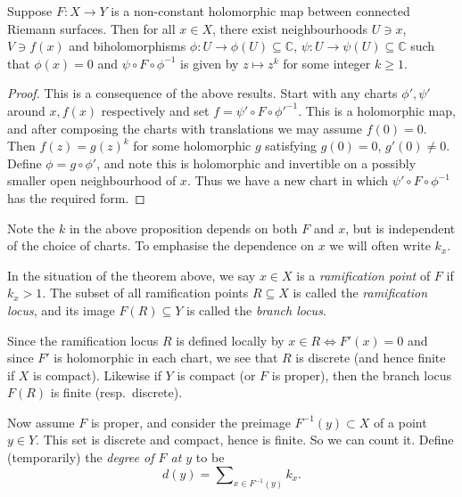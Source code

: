 \begin{proposition}
    Suppose \(F:X\to Y\) is a non-constant holomorphic map between connected
    Riemann surfaces. Then for all \(x\in X\), there exist neighbourhoods \(U\ni
    x\), \(V\ni f(x)\) and biholomorphisms \(\phi:U\to \phi(U)\subseteq
    \mathbb{C}\), \(\psi:U\to \psi(U)\subseteq \mathbb{C}\) such that
    \(\phi(x)=0\) and \(\psi\circ F\circ \phi^{-1}\) is
    given by \(z\mapsto z^k\) for some integer \(k\geq 1\).

    \begin{proof}
        This is a consequence of the above results. Start with any charts
        \(\phi', \psi'\) around \(x, f(x)\) respectively and set \(f=\psi'\circ
        F\circ \phi'^{-1}\). This is a holomorphic map, and after composing the
        charts with translations we may assume \(f(0)=0\). Then \(f(z)=g(z)^k\)
        for some holomorphic \(g\) satisfying \(g(0)=0\), \(g'(0)\neq 0\).
        Define \(\phi=g\circ \phi'\), and note this is holomorphic and
        invertible on a possibly smaller open neighbourhood of \(x\). Thus we
        have a new chart in which \(\psi'\circ F\circ \phi^{-1}\) has the
        required form.
    \end{proof}
\end{proposition}

Note the \(k\) in the above proposition depends on both \(F\) and \(x\), but is
independent of the choice of charts. To emphasise the dependence on \(x\) we
will often write \(k_x\).

\begin{definition}
    In the situation of the theorem above, we say \(x\in X\) is a
    \textit{ramification point} of \(F\) if \(k_x>1\). The subset of all
    ramification points \(R\subseteq X\) is called the \textit{ramification
    locus}, and its image \(F(R)\subseteq Y\) is called the \textit{branch
    locus}.
\end{definition}

Since the ramification locus \(R\) is defined locally by \(x\in R\iff F'(x)=0\)
and since \(F'\) is holomorphic in each chart, we see that \(R\) is discrete
(and hence finite if \(X\) is compact). Likewise if \(Y\) is compact (or \(F\)
is proper), then the branch locus \(F(R)\) is finite (resp.\ discrete).

Now assume \(F\) is proper, and consider the preimage \(F^{-1}(y)\subset X\) of
a point \(y\in Y\). This set is discrete and compact, hence is finite. So we can
count it. Define (temporarily) the \textit{degree of \(F\) at \(y\)} to be
\[
    d(y)=\sum\nolimits_{x\in F^{-1}(y)}k_x.
\]

